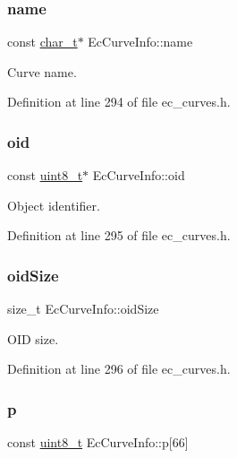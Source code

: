 \subsubsection{\texorpdfstring{name}{name}}
{\footnotesize\ttfamily const \hyperlink{compiler__port_8h_a40bb5262bf908c328fbcfbe5d29d0201}{char\+\_\+t}$\ast$ Ec\+Curve\+Info\+::name}



Curve name. 



Definition at line 294 of file ec\+\_\+curves.\+h.

\mbox{\label{structEcCurveInfo_a92a5953e46ab92ae71576c79d225d72e}} 
\subsubsection{\texorpdfstring{oid}{oid}}
{\footnotesize\ttfamily const \hyperlink{stdint_8h_aba7bc1797add20fe3efdf37ced1182c5}{uint8\+\_\+t}$\ast$ Ec\+Curve\+Info\+::oid}



Object identifier. 



Definition at line 295 of file ec\+\_\+curves.\+h.

\mbox{\label{structEcCurveInfo_aa948a3d595c3de00163f6e4ec47b80a2}} 
\subsubsection{\texorpdfstring{oid\+Size}{oidSize}}
{\footnotesize\ttfamily size\+\_\+t Ec\+Curve\+Info\+::oid\+Size}



O\+ID size. 



Definition at line 296 of file ec\+\_\+curves.\+h.

\mbox{\label{structEcCurveInfo_adf2630219e7e7fba803e3495da250f63}} 
\subsubsection{\texorpdfstring{p}{p}}
{\footnotesize\ttfamily const \hyperlink{stdint_8h_aba7bc1797add20fe3efdf37ced1182c5}{uint8\+\_\+t} Ec\+Curve\+Info\+::p\mbox{[}66\mbox{]}}



